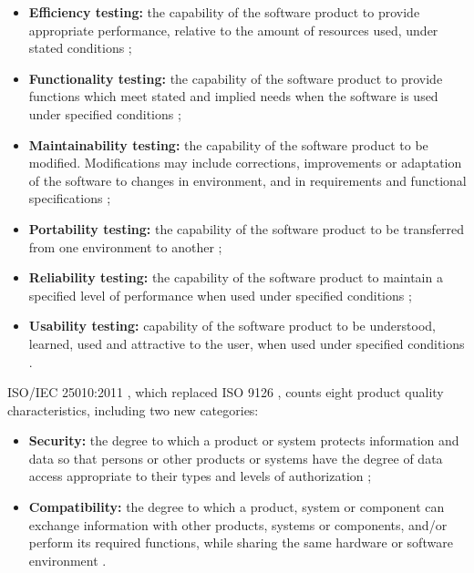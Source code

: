 \begin{itemize}
    \item \textbf{Efficiency testing:} the capability of the
        software product to provide appropriate performance,
        relative to the amount of resources used, under stated
        conditions \cite{iso9126};

    \item \textbf{Functionality testing:} the capability of the
        software product to provide functions which meet stated
        and implied needs when the software is used under
        specified conditions \cite{iso9126};

    \item \textbf{Maintainability testing:} the capability of the
        software product to be modified. Modifications may
        include corrections, improvements or adaptation of the
        software to changes in environment, and in requirements
        and functional specifications \cite{iso9126};

    \item \textbf{Portability testing:} the capability of the
        software product to be transferred from one environment
        to another \cite{iso9126};

    \item \textbf{Reliability testing:} the capability of the
        software product to maintain a specified level of
        performance when used under specified conditions
        \cite{iso9126};

    \item \textbf{Usability testing:} capability of the software
        product to be understood, learned, used and attractive to
        the user, when used under specified conditions
        \cite{iso9126}.
\end{itemize}

ISO/IEC 25010:2011 \cite{10951538}, which replaced ISO 9126
\cite{iso9126}, counts eight product quality characteristics,
including two new categories:

\begin{itemize}
    \item \textbf{Security:} the degree to which a product or
        system protects information and data so that persons or
        other products or systems have the degree of data access
        appropriate to their types and levels of authorization
        \cite{10951538};

    \item \textbf{Compatibility:} the degree to which a product,
        system or component can exchange information with other
        products, systems or components, and/or perform its
        required functions, while sharing the same hardware or
        software environment \cite{10951538}.
\end{itemize}

